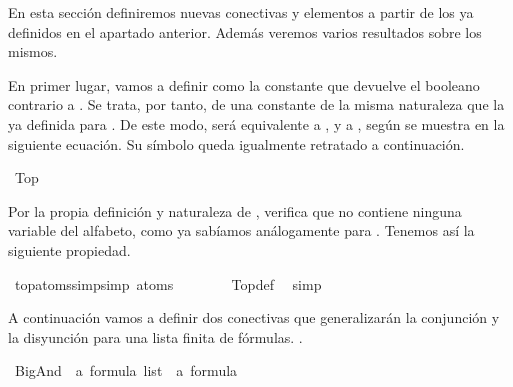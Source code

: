 \begin{isabellebody}
%
\endisadelimdocument
%
\begin{isamarkuptext}%
En esta sección definiremos nuevas conectivas y elementos a partir de los ya definidos en el
apartado anterior. Además veremos varios resultados sobre los mismos.%
\end{isamarkuptext}\isamarkuptrue%
%
\begin{isamarkuptext}%
En primer lugar, vamos a definir  como la constante  que devuelve
el booleano contrario a . Se trata, por tanto, de una constante de la misma naturaleza que
la ya definida para . De este modo,  será equivalente a , y  a ,
según se muestra en la siguiente ecuación. Su símbolo queda igualmente retratado a continuación.%
\end{isamarkuptext}\isamarkuptrue%
\isamarkupfalse%
\ Top\ {\isacharparenleft}{\isachardoublequoteopen}{\isasymtop}{\isachardoublequoteclose}{\isacharparenright}\ \isanewline
{\isachardoublequoteopen}{\isasymtop}\ {\isasymequiv}\ {\isasymbottom}\ \isactrlbold {\isasymrightarrow}\ {\isasymbottom}{\isachardoublequoteclose}%
\begin{isamarkuptext}%
Por la propia definición y naturaleza de , verifica que no contiene ninguna variable del
alfabeto, como ya sabíamos análogamente para . Tenemos así la siguiente propiedad.%
\end{isamarkuptext}\isamarkuptrue%
\isamarkupfalse%
\ top{\isacharunderscore}atoms{\isacharunderscore}simp{\isacharbrackleft}simp{\isacharbrackright}{\isacharcolon}\ {\isachardoublequoteopen}atoms\ {\isasymtop}\ {\isacharequal}\ {\isacharbraceleft}{\isacharbraceright}{\isachardoublequoteclose}\ \isanewline
%
\isadelimproof
\ \ %
\endisadelimproof
%
\isatagproof
{}\isamarkupfalse%
\ Top{\isacharunderscore}def\ \isamarkupfalse%
\ simp%
\endisatagproof
{\isafoldproof}%
%
\isadelimproof
%
\endisadelimproof
%
\begin{isamarkuptext}%
A continuación vamos a definir dos conectivas que generalizarán la conjunción y la disyunción
para una lista finita de fórmulas. .%
\end{isamarkuptext}\isamarkuptrue%
\isamarkupfalse%
\ BigAnd\ {\isacharcolon}{\isacharcolon}\ {\isachardoublequoteopen}{\isacharprime}a\ formula\ list\ {\isasymRightarrow}\ {\isacharprime}a\ formula{\isachardoublequoteclose}\ {\isacharparenleft}{\isachardoublequoteopen}\isactrlbold {\isasymAnd}{\isacharunderscore}{\isachardoublequoteclose}{\isacharparenright}\ \isanewline

\end{isabellebody}
